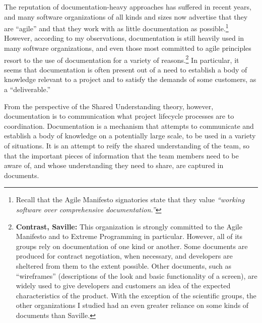 The reputation of documentation-heavy approaches has suffered in recent years, and many software organizations of all kinds and sizes now advertise that they are ``agile'' and that they work with as little documentation as possible.\footnote{Recall that the Agile Manifesto signatories state that they value \emph{``working software over comprehensive documentation.''}} However, according to my observations, documentation is still heavily used in many software organizations, and even those most committed to agile principles resort to the use of documentation for a variety of reasons.\footnote{\textbf{Contrast, Saville:} This organization is strongly committed to the Agile Manifesto and to Extreme Programming in particular. However, all of its groups rely on documentation of one kind or another. Some documents are produced for contract negotiation, when necessary, and developers are sheltered from them to the extent possible. Other documents, such as ``wireframes'' (descriptions of the look and basic functionality of a screen), are widely used to give developers and customers an idea of the expected characteristics of the product. With the exception of the scientific groups, the other organizations I studied had an even greater reliance on some kinds of documents than Saville.} In particular, it seems that documentation is often present out of a need to establish a body of knowledge relevant to a project and to satisfy the demands of some customers, as a ``deliverable.''

From the perspective of the Shared Understanding theory, however, documentation is to communication what project lifecycle processes are to coordination. Documentation is a mechanism that attempts to communicate and establish a body of knowledge on a potentially large scale, to be used in a variety of situations. It is an attempt to reify the shared understanding of the team, so that the important pieces of information that the team members need to be aware of, and whose understanding they need to share, are captured in documents.


